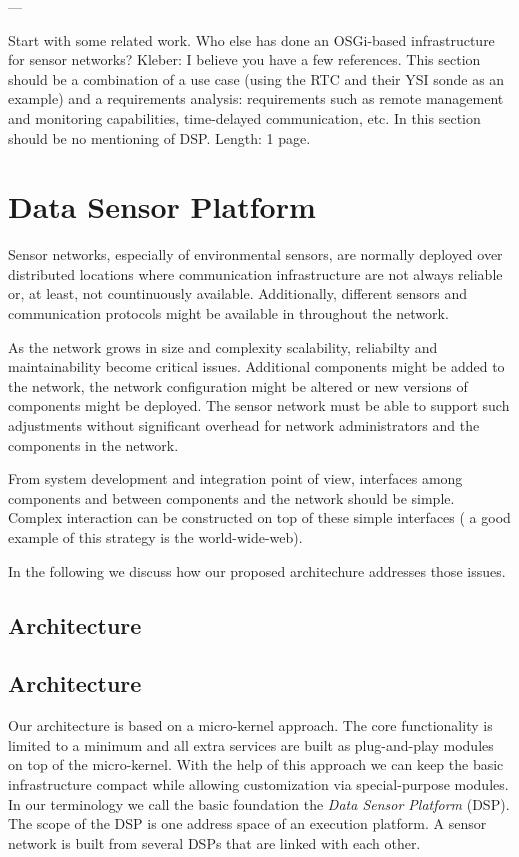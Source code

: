 \documentclass[conference]{IEEEtran}
\begin{document}
---

Start with some related work. Who else has done an OSGi-based
infrastructure for sensor networks? Kleber: I believe you have a few
references. This section should be a combination of a use case (using
the RTC and their YSI sonde as an example) and a requirements
analysis: requirements such as remote management and monitoring
capabilities, time-delayed communication, etc. In this section should
be no mentioning of DSP. Length: 1 page.

\section{Data Sensor Platform}

Sensor networks, especially of environmental sensors, are normally deployed
over distributed locations where communication infrastructure are not always 
reliable or, at least, not countinuously available. Additionally, different
sensors and communication protocols might be available in throughout the network.

As the network grows in size and complexity scalability, reliabilty and maintainability
become critical issues. Additional components 
might be added to the network, the network configuration might be altered or 
new versions of components might be deployed. The sensor network must be able to 
support such adjustments without significant overhead for network administrators and
the components in the network.

From system development and integration point of view, interfaces among components and
between components and the network should be simple. Complex interaction can be 
constructed on top of these simple interfaces ( a good example of this strategy is the 
world-wide-web). 

In the following we discuss how our proposed architechure addresses those issues.

\subsection{Architecture}

\subsection{Architecture}

Our architecture is based on a micro-kernel approach. The core
functionality is limited to a minimum and all extra services are built
as plug-and-play modules on top of the micro-kernel. With the help of
this approach we can keep the basic infrastructure compact while
allowing customization via special-purpose modules. In our terminology
we call the basic foundation the \emph{Data Sensor Platform}
(DSP). The scope of the DSP is one address space of an execution
platform. A sensor network is built from several DSPs that are linked
with each other.
\end{document}
